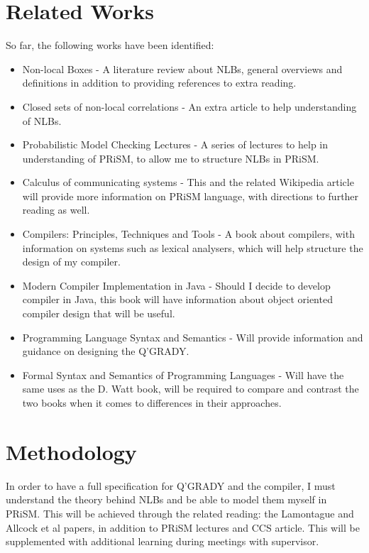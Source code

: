\documentclass[11pt, a4paper]{article}
\begin{document}

\section{Related Works} %
\label{sec:related_works}
So far, the following works have been identified:
\begin{itemize}
    \item Non-local Boxes \parencite{nlb_lamontague} - A literature review about
    NLBs, general overviews and definitions in addition to providing references
    to extra reading.
    \item Closed sets of non-local correlations
    \parencite{Jonathan-Allcock:2009pd} - An extra article to help understanding
    of NLBs.
    \item Probabilistic Model Checking Lectures \parencite{prism_lectures} - A
    series of lectures to help in understanding of PRiSM, to allow me to
    structure NLBs in PRiSM.
    \item Calculus of communicating systems \parencite{ccs} - This and the
    related Wikipedia article will provide more information on PRiSM language,
    with directions to further reading as well. 
    \item Compilers: Principles, Techniques and Tools
    \parencite{dragon_compiler} - A book about compilers, with information on
    systems such as lexical analysers, which will help structure the design of
    my compiler.
    \item Modern Compiler Implementation in Java \parencite{java_compiler} -
    Should I decide to develop compiler in Java, this book will have information
    about object oriented compiler design that will be useful.
    \item Programming Language Syntax and Semantics \parencite{plss} - Will
    provide information and guidance on designing the Q'GRADY.
    \item Formal Syntax and Semantics of Programming Languages \parencite{fsspl}
    - Will have the same uses as the D. Watt book, will be required to compare
    and contrast the two books when it comes to differences in their approaches.
\end{itemize}


\section{Methodology} %
\label{sec:methodology}
In order to have a full specification for Q'GRADY and the compiler, I must 
understand the theory behind NLBs and be able to model them myself in PRiSM.
This will be achieved through the related reading: the Lamontague and Allcock et
al papers, in addition to PRiSM lectures and CCS article. This will be
supplemented with additional learning during meetings with supervisor.
\end{document}
